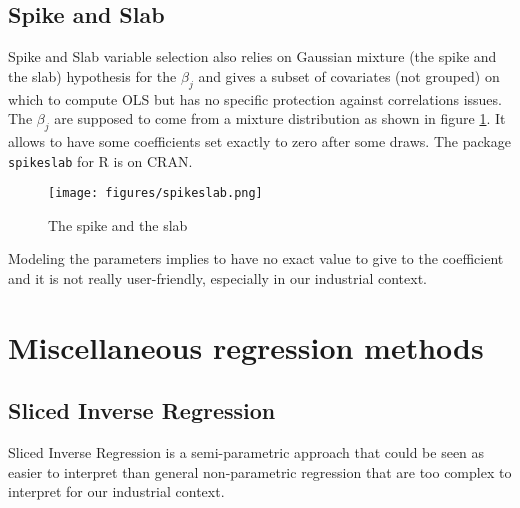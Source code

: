 \documentclass[12pt,a4paper]{report}
\begin{document}
		\subsection{Spike and Slab}			%

			Spike and Slab variable selection \cite{ishwaran2005spike} also relies on Gaussian mixture (the spike and the slab) hypothesis for the $\beta_j$ and gives a subset of covariates (not grouped) on which to compute \textsc{OLS} but has no specific protection against correlations issues.  The $\beta_j$ are supposed to come from a mixture distribution as shown in figure \ref{spikeslab}. It allows to have some coefficients set exactly to zero after some draws. The package {\tt spikeslab} for R is on CRAN. \\
			
\begin{figure}[h!]
	\centering
	\texttt{[image: figures/spikeslab.png]} 
	\caption{The spike and the slab}\label{spikeslab}
\end{figure}		
		
		Modeling the parameters implies to have no exact value to give to the coefficient and it is not really user-friendly, especially in our industrial context. %
		
		\FloatBarrier
	
		
		
		
		\section{Miscellaneous regression methods}	
			
	\subsection{Sliced Inverse Regression}
		Sliced Inverse Regression is a semi-parametric approach that could be seen as easier to interpret than general non-parametric regression \cite{eubank1999nonparametric,hardle1990applied} that are too complex to interpret for our industrial context. \\
		
\end{document}
